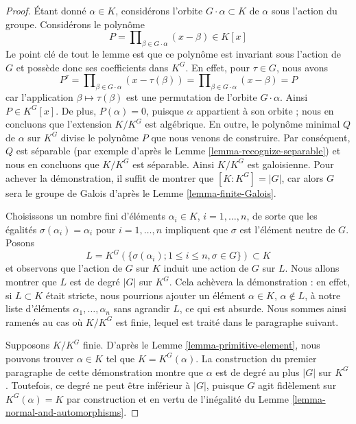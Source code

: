 \begin{proof}
Étant donné $\alpha \in K$, considérons l'orbite $G \cdot \alpha \subset K$
de $\alpha$ sous l'action du groupe. Considérons le polynôme
$$
P = \prod\nolimits_{\beta \in G \cdot \alpha} (x - \beta) \in K[x]
$$
Le point clé de tout le lemme est que ce polynôme est invariant
sous l'action de $G$ et possède donc ses coefficients dans $K^G$.
En effet, pour $\tau \in G$, nous avons
$$
P^\tau = \prod\nolimits_{\beta \in G \cdot \alpha} (x - \tau(\beta)) =
\prod\nolimits_{\beta \in G \cdot \alpha} (x - \beta) = P
$$
car l'application $\beta \mapsto \tau(\beta)$ est une permutation de
l'orbite $G \cdot \alpha$. Ainsi $P \in K^G[x]$. De plus,
$P(\alpha) = 0$, puisque $\alpha$ appartient à son orbite ;
nous en concluons que l'extension $K/K^G$ est algébrique. En outre,
le polynôme minimal $Q$ de $\alpha$ sur $K^G$ divise le
polynôme $P$ que nous venons de construire. Par conséquent, $Q$ est séparable
(par exemple d'après le Lemme \ref{lemma-recognize-separable}) et
nous en concluons que $K/K^G$ est séparable. Ainsi $K/K^G$ est galoisienne.
Pour achever la démonstration, il suffit de montrer que $[K : K^G] = |G|$,
car alors $G$ sera le groupe de Galois d'après le
Lemme \ref{lemma-finite-Galois}.

\medskip\noindent
Choisissons un nombre fini d'éléments $\alpha_i \in K$, $i = 1, \ldots, n$,
de sorte que les égalités $\sigma(\alpha_i) = \alpha_i$ pour $i = 1, \ldots, n$ impliquent
que $\sigma$ est l'élément neutre de $G$. Posons
$$
L = K^G(\{\sigma(\alpha_i); 1 \leq i \leq n, \sigma \in G\}) \subset K
$$
et observons que l'action de $G$ sur $K$ induit une action de $G$ sur $L$.
Nous allons montrer que $L$ est de degré $|G|$ sur $K^G$. Cela achèvera la
démonstration : en effet, si $L \subset K$ était stricte, nous pourrions ajouter un élément
$\alpha \in K$, $\alpha \not \in L$, à notre liste d'éléments
$\alpha_1, \ldots, \alpha_n$ sans agrandir $L$, ce qui est absurde.
Nous sommes ainsi ramenés au cas où $K/K^G$ est finie, lequel est
traité dans le paragraphe suivant.

\medskip\noindent
Supposons $K/K^G$ finie. D'après le Lemme \ref{lemma-primitive-element},
nous pouvons trouver $\alpha \in K$ tel que $K = K^G(\alpha)$.
La construction du premier paragraphe de cette démonstration montre
que $\alpha$ est de degré au plus $|G|$ sur $K^G$. Toutefois, ce
degré ne peut être inférieur à $|G|$, puisque $G$ agit fidèlement sur
$K^G(\alpha) = K$ par construction et en vertu de l'inégalité du
Lemme \ref{lemma-normal-and-automorphisms}.
\end{proof}

